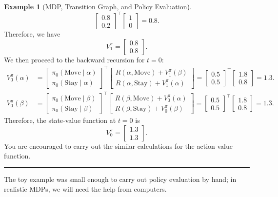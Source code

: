 \documentclass[
]{book}
\theoremstyle{definition}
\theoremstyle{definition}
\newtheorem{example}{Example}[chapter]
\theoremstyle{definition}
\theoremstyle{definition}
\theoremstyle{remark}
\begin{document}
\begin{example}[MDP, Transition Graph, and Policy Evaluation]
\begin{equation}
\begin{bmatrix}
0.8 \\ 0.2
\end{bmatrix}^{\top}
\begin{bmatrix}
1 \\ 0
\end{bmatrix} = 0.8.
\end{equation}
Therefore, we have
\[
V^{\pi}_1 = \begin{bmatrix}
0.8 \\ 0.8
\end{bmatrix}.
\]
We then proceed to the backward recursion for \(t=0\):
\begin{align}
V_0^{\pi}(\alpha) & = \begin{bmatrix}
\pi_0(\text{Move} \mid \alpha) \\
\pi_0(\text{Stay} \mid \alpha)
\end{bmatrix}^{\top} \begin{bmatrix}
R(\alpha, \text{Move}) + V^{\pi}_1(\beta) \\
R(\alpha, \text{Stay}) + V^{\pi}_1(\alpha)
\end{bmatrix} = \begin{bmatrix}
0.5 \\ 0.5
\end{bmatrix}^{\top}
\begin{bmatrix}
1.8 \\ 0.8
\end{bmatrix} = 1.3. \\
V_0^{\pi}(\beta) & = \begin{bmatrix}
\pi_0(\text{Move} \mid \beta) \\
\pi_0(\text{Stay} \mid \beta)
\end{bmatrix}^{\top} \begin{bmatrix}
R(\beta, \text{Move}) + V^{\pi}_0(\alpha) \\
R(\beta, \text{Stay}) + V^{\pi}_0(\beta)
\end{bmatrix} = \begin{bmatrix}
0.5 \\ 0.5
\end{bmatrix}^{\top}
\begin{bmatrix}
1.8 \\ 0.8
\end{bmatrix} = 1.3.
\end{align}
Therefore, the state-value function at \(t=0\) is
\[
V^{\pi}_0 = \begin{bmatrix}
1.3 \\ 1.3
\end{bmatrix}.
\]
You are encouraged to carry out the similar calculations for the action-value function.

\begin{center}\rule{0.5\linewidth}{0.5pt}\end{center}

The toy example was small enough to carry out policy evaluation by hand; in realistic MDPs, we will need the help from computers.
\end{example}
\end{document}
